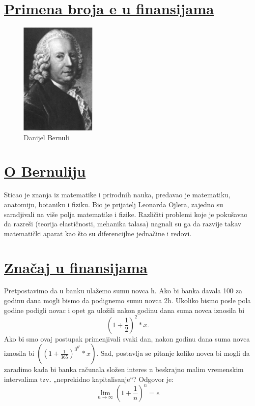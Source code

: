 \documentclass{article}
\begin{document}
	\pagestyle{fancy}
	\fancyhead{}
	\section*{\uline{Primena broja e u finansijama}}
	\begin{figure}
		\begin{center}
			\includegraphics[width=0.33\textwidth]{bernuli.jpg}
		\end{center}
		\caption{Danijel Bernuli}
	\end{figure}
	\paragraph{}
	\section*{\uline{O Bernuliju}}
	Sticao je znanja iz matematike i prirodnih nauka, predavao je matematiku, anatomiju, botaniku i fiziku. Bio je prijatelj Leonarda Ojlera, zajedno su saradjivali na više polja matematike i fizike. Različiti problemi koje je pokušavao da razreši (teorija elastičnosti, mehanika talasa) nagnali su ga da razvije takav matematički aparat kao što su diferencijlne jednačine i redovi.
	\section*{\uline{Značaj u finansijama}}
	Pretpostavimo da u banku ulažemo sumu novca h. Ako bi banka davala 100%
	za godinu dana mogli bismo da podignemo sumu novca 2h. Ukoliko bismo posle pola
	godine podigli novac i opet ga uložili nakon godinu dana suma novca iznosila bi
	\begin{equation} (1+\frac{1}{2})^2*x. \end{equation}
	Ako bi smo ovaj postupak primenjivali svaki dan, nakon godinu dana suma novca
	iznosila bi $((1+\frac{1}{365})^3^6^5*x)$. Sad, postavlja se pitanje koliko novca bi mogli da zaradimo kada bi banka računala složen interes n beskrajno malim vremenskim intervalima tzv. „neprekidno kapitalisanje“? Odgovor je:
	\begin{equation} \lim_{n \rightarrow \infty} (1+\frac{1}{n})^n=e \end{equation}
	\newpage{}
\end{document}
